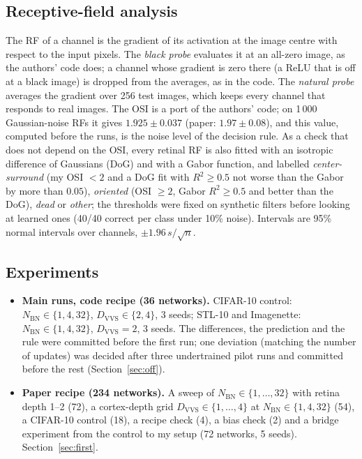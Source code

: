 \documentclass[11pt,a4paper]{article}
\newcommand{\NBN}{N_{\mathrm{BN}}}
\newcommand{\DVVS}{D_{\mathrm{VVS}}}
\begin{document}
\subsection{Receptive-field analysis}
The RF of a channel is the gradient of its activation at the image centre with respect to the input pixels. The \emph{black probe} evaluates it at an all-zero image, as the authors' code does; a channel whose gradient is zero there (a ReLU that is off at a black image) is dropped from the averages, as in the code. The \emph{natural probe} averages the gradient over 256 test images, which keeps every channel that responds to real images. The OSI is a port of the authors' code; on 1\,000 Gaussian-noise RFs it gives $1.925\pm0.037$ (paper: $1.97\pm0.08$), and this value, computed before the runs, is the noise level of the decision rule. As a check that does not depend on the OSI, every retinal RF is also fitted with an isotropic difference of Gaussians (DoG) and with a Gabor function, and labelled \emph{center-surround} (my OSI $<2$ and a DoG fit with $R^2\ge0.5$ not worse than the Gabor by more than $0.05$), \emph{oriented} (OSI $\ge2$, Gabor $R^2\ge0.5$ and better than the DoG), \emph{dead} or \emph{other}; the thresholds were fixed on synthetic filters before looking at learned ones (40/40 correct per class under 10\% noise). Intervals are 95\% normal intervals over channels, $\pm1.96\,s/\sqrt{n}$.

\subsection{Experiments}
\begin{itemize}
\item \textbf{Main runs, code recipe (36 networks).} CIFAR-10 control: $\NBN\in\{1,4,32\}$, $\DVVS\in\{2,4\}$, 3 seeds; STL-10 and Imagenette: $\NBN\in\{1,4,32\}$, $\DVVS=2$, 3 seeds. The differences, the prediction and the rule were committed before the first run; one deviation (matching the number of updates) was decided after three undertrained pilot runs and committed before the rest (Section~\ref{sec:off}).
\item \textbf{Paper recipe (234 networks).} A sweep of $\NBN\in\{1,\dots,32\}$ with retina depth 1--2 (72), a cortex-depth grid $\DVVS\in\{1,\dots,4\}$ at $\NBN\in\{1,4,32\}$ (54), a CIFAR-10 control (18), a recipe check (4), a bias check (2) and a bridge experiment from the control to my setup (72 networks, 5 seeds). Section~\ref{sec:first}.
\end{itemize}
\end{document}
